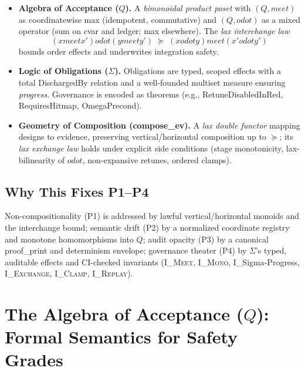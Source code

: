 \documentclass[11pt]{article}
\theoremstyle{plain}
\theoremstyle{definition}
\theoremstyle{remark}
\def\Q{Q}%
\def\Sig{\Sigma}%
\def\composeev{compose\_ev}%
\def\vmeet{meet}%
\def\hplus{odot}%
\def\code#1{#1}%
\def\ISigma{I\_Sigma-Progress}%
\DeclareRobustCommand{\Q}{\texorpdfstring{\ensuremath{\mathcal{Q}}}{Q}}     %
\DeclareRobustCommand{\Sig}{\texorpdfstring{\ensuremath{\Sigma}}{\Sigma}}   %
\DeclareMathOperator{\composeevOp}{compose\_ev}
\DeclareRobustCommand{\composeev}{\texorpdfstring{\ensuremath{\composeevOp}}{compose\_ev}}
\newcommand{\vmeet}{\wedge}                    %
\newcommand{\hplus}{\odot}                     %
\newcommand{\geqQ}{\succeq}
\newcommand{\code}[1]{\texttt{\textup{#1}}}    %
\newcommand{\ledger}{\code{ledger}}
\newcommand{\cvar}{\code{cvar}}
\newcommand{\IMeet}{\textsc{I\_Meet}}
\newcommand{\IMono}{\textsc{I\_Mono}}
\DeclareRobustCommand{\ISigma}{%
  \texorpdfstring{\textsc{I\_\ensuremath{\Sigma}-Progress}}{\textsc{I\_Sigma-Progress}}%
}
\newcommand{\IExchange}{\textsc{I\_Exchange}}
\newcommand{\IClamp}{\textsc{I\_Clamp}}
\newcommand{\IReplay}{\textsc{I\_Replay}}
\def\Q{Q}%
\def\Sig{\Sigma}%
\def\composeev{compose\_ev}%
\def\vmeet{meet}%
\def\hplus{odot}%
\def\code#1{#1}%
\begin{document}
\begin{itemize}
  \item \textbf{Algebra of Acceptance ($\Q$).} A \emph{bimonoidal product poset} with $(\Q,\vmeet)$ as coordinatewise max (idempotent, commutative) and $(\Q,\hplus)$ as a mixed operator (sum on \cvar{} and \ledger; max elsewhere). The \emph{lax interchange law}
  \[
    (x \vmeet x') \hplus (y \vmeet y') \;\geqQ\; (x \hplus y) \vmeet (x' \hplus y')
  \]
  bounds order effects and underwrites integration safety.
  \item \textbf{Logic of Obligations ($\Sig$).} Obligations are typed, scoped effects with a total \code{DischargedBy} relation and a well-founded multiset measure ensuring \emph{progress}. Governance is encoded as theorems (e.g., \code{RetuneDisabledInRed}, \code{RequiresHitmap}, \code{OmegaPrecond}).
  \item \textbf{Geometry of Composition (\composeev).} A \emph{lax double functor} mapping designs to evidence, preserving vertical/horizontal composition up to $\geqQ$; its \emph{lax exchange law} holds under explicit side conditions (stage monotonicity, lax-bilinearity of $\hplus$, non-expansive retunes, ordered clamps).
\end{itemize}

\subsection{Why This Fixes P1–P4}
Non-compositionality (P1) is addressed by lawful vertical/horizontal monoids and the interchange bound; semantic drift (P2) by a normalized coordinate registry and monotone homomorphisms into $\Q$; audit opacity (P3) by a canonical \code{proof\_print} and determinism envelope; governance theater (P4) by $\Sig$’s typed, auditable effects and CI-checked invariants (\IMeet, \IMono, \ISigma, \IExchange, \IClamp, \IReplay).


\section{The Algebra of Acceptance ($\Q$): Formal Semantics for Safety Grades}
\label{sec:algebra-Q}
\end{document}
